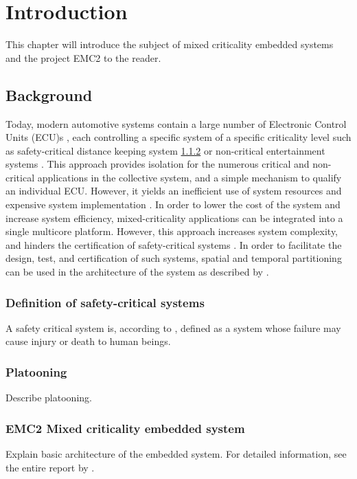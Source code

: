 \chapter{Introduction}
\label{sec:introduction}
This chapter will introduce the subject of mixed criticality embedded systems and the project EMC2 to the reader.

\section{Background}
Today, modern automotive systems contain a large number of Electronic Control Units (ECU)s \cite{}, each controlling a specific system of a specific criticality level such as safety-critical distance keeping system \ref{sec:platooning} or non-critical entertainment systems \cite{}. This approach provides isolation for the numerous critical and non-critical applications in the collective system, and a simple mechanism to qualify an individual ECU. However, it yields an inefficient use of system resources \cite{} and expensive system implementation \cite{}. In order to lower the cost of the system and increase system efficiency, mixed-criticality applications can be integrated into a single multicore platform. However, this approach increases system complexity, and hinders the certification of safety-critical systems \cite{}. In order to facilitate the design, test, and certification of such systems, spatial and temporal partitioning can be used in the architecture of the system as described by \cite{zaki2016}.

\subsection{Definition of safety-critical systems}
A safety critical system is, according to \cite{}, defined as a system whose failure may cause injury or death to human beings.
\subsection{Platooning}
\label{sec:platooning}
Describe platooning.

\subsection{EMC2 Mixed criticality embedded system}
\label{sec:mces}
Explain basic architecture of the embedded system. For detailed information, see the entire report by \cite{zaki2016}.

